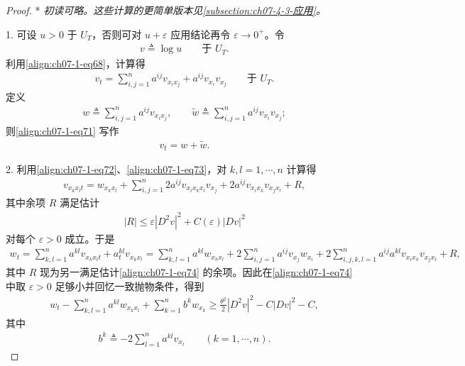 \documentclass[../../main.tex]{subfiles}
\begin{document}
\begin{proof}*
\emph{初读可略。这些计算的更简单版本见\cref{subsection:ch07-4-3-应用}。}

1. 可设 $u>0$ 于 $U_T$，否则可对 $u+\varepsilon$ 应用结论再令 $\varepsilon\to 0^+$。令
\begin{align}
v\triangleq \log u\qquad \text{于 } U_T.\label{align:ch07-1-eq70}
\end{align}
利用\eqref{align:ch07-1-eq68}，计算得
\begin{align}
v_t = \sum_{i,j=1}^n a^{ij}v_{x_ix_j} + a^{ij}v_{x_i}v_{x_j}\qquad \text{于 } U_T.\label{align:ch07-1-eq71}
\end{align}
定义
\begin{align}
w\triangleq \sum_{i,j=1}^n a^{ij}v_{x_ix_j},\qquad \widetilde{w}\triangleq \sum_{i,j=1}^n a^{ij}v_{x_i}v_{x_j};\label{align:ch07-1-eq72}
\end{align}
则\eqref{align:ch07-1-eq71} 写作
\begin{align}
v_t = w+\widetilde{w}.\label{align:ch07-1-eq73}
\end{align}

2. 利用\eqref{align:ch07-1-eq72}、\eqref{align:ch07-1-eq73}，对 $k,l=1,\cdots,n$ 计算得
\begin{align*}
v_{x_kx_lt} = w_{x_kx_l} + \sum_{i,j=1}^n 2a^{ij}v_{x_ix_kx_l}v_{x_j} + 2a^{ij}v_{x_ix_k}v_{x_jx_l} + R,
\end{align*}
其中余项 $R$ 满足估计
\begin{align}
|R| \leqslant \varepsilon|D^2v|^2 + C(\varepsilon)|Dv|^2\label{align:ch07-1-eq74}
\end{align}
对每个 $\varepsilon>0$ 成立。于是
\begin{align*}
w_t = \sum_{k,l=1}^n a^{kl}v_{x_kx_lt} + a_t^{kl}v_{x_kx_l}
= \sum_{k,l=1}^n a^{kl}w_{x_kx_l} + 2\sum_{i,j=1}^n a^{ij}v_{x_j}w_{x_i} + 2\sum_{i,j,k,l=1}^n a^{ij}a^{kl}v_{x_ix_k}v_{x_jx_l} + R,
\end{align*}
其中 $R$ 现为另一满足估计\eqref{align:ch07-1-eq74} 的余项。因此在\eqref{align:ch07-1-eq74} 中取 $\varepsilon>0$ 足够小并回忆一致抛物条件，得到
\begin{align}
w_t - \sum_{k,l=1}^n a^{kl}w_{x_kx_l} + \sum_{k=1}^n b^k w_{x_k} \geqslant \frac{\theta^2}{2}|D^2v|^2 - C|Dv|^2 - C,\label{align:ch07-1-eq75}
\end{align}
其中
\begin{align}
b^k\triangleq -2\sum_{l=1}^n a^{kl}v_{x_l}\qquad (k=1,\cdots,n).\label{align:ch07-1-eq76}
\end{align}


\end{proof}
\end{document}
